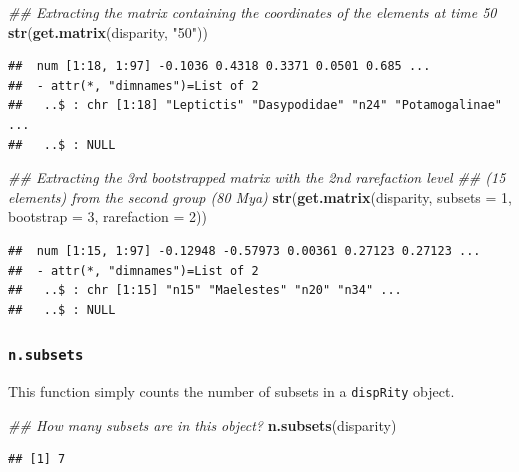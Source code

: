 \documentclass[
]{book}
\newenvironment{Shaded}{\begin{snugshade}}{\end{snugshade}}
\newcommand{\CommentTok}[1]{\textcolor[rgb]{0.56,0.35,0.01}{\textit{#1}}}
\newcommand{\DataTypeTok}[1]{\textcolor[rgb]{0.13,0.29,0.53}{#1}}
\newcommand{\DecValTok}[1]{\textcolor[rgb]{0.00,0.00,0.81}{#1}}
\newcommand{\KeywordTok}[1]{\textcolor[rgb]{0.13,0.29,0.53}{\textbf{#1}}}
\newcommand{\NormalTok}[1]{#1}
\newcommand{\StringTok}[1]{\textcolor[rgb]{0.31,0.60,0.02}{#1}}
\begin{document}
\begin{Shaded}
\begin{Highlighting}[]
\CommentTok{\#\# Extracting the matrix containing the coordinates of the elements at time 50}
\KeywordTok{str}\NormalTok{(}\KeywordTok{get.matrix}\NormalTok{(disparity, }\StringTok{"50"}\NormalTok{))}
\end{Highlighting}
\end{Shaded}

\begin{verbatim}
##  num [1:18, 1:97] -0.1036 0.4318 0.3371 0.0501 0.685 ...
##  - attr(*, "dimnames")=List of 2
##   ..$ : chr [1:18] "Leptictis" "Dasypodidae" "n24" "Potamogalinae" ...
##   ..$ : NULL
\end{verbatim}

\begin{Shaded}
\begin{Highlighting}[]
\CommentTok{\#\# Extracting the 3rd bootstrapped matrix with the 2nd rarefaction level}
\CommentTok{\#\# (15 elements) from the second group (80 Mya)}
\KeywordTok{str}\NormalTok{(}\KeywordTok{get.matrix}\NormalTok{(disparity, }\DataTypeTok{subsets =} \DecValTok{1}\NormalTok{, }\DataTypeTok{bootstrap =} \DecValTok{3}\NormalTok{, }\DataTypeTok{rarefaction =} \DecValTok{2}\NormalTok{))}
\end{Highlighting}
\end{Shaded}

\begin{verbatim}
##  num [1:15, 1:97] -0.12948 -0.57973 0.00361 0.27123 0.27123 ...
##  - attr(*, "dimnames")=List of 2
##   ..$ : chr [1:15] "n15" "Maelestes" "n20" "n34" ...
##   ..$ : NULL
\end{verbatim}

\hypertarget{n.subsets}{%
\subsubsection{\texorpdfstring{\texttt{n.subsets}}{n.subsets}}\label{n.subsets}}

This function simply counts the number of subsets in a \texttt{dispRity} object.

\begin{Shaded}
\begin{Highlighting}[]
\CommentTok{\#\# How many subsets are in this object?}
\KeywordTok{n.subsets}\NormalTok{(disparity)}
\end{Highlighting}
\end{Shaded}

\begin{verbatim}
## [1] 7
\end{verbatim}
\end{document}
